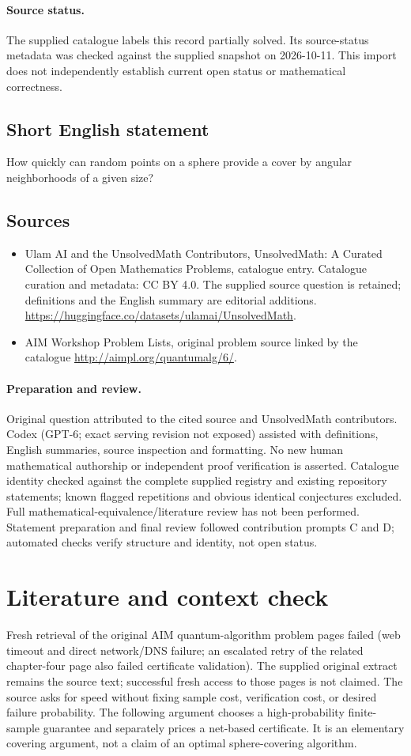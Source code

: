 \documentclass[11pt]{article}
\begin{document}
\paragraph{Source status.}
The supplied catalogue labels this record partially solved. Its source-status metadata was checked against the supplied snapshot on 2026-10-11. This import does not independently establish current open status or mathematical correctness.
\subsection{Short English statement}
How quickly can random points on a sphere provide a cover by angular neighborhoods of a given size?
\subsection{Sources}
\begin{itemize}
\item[S1] Ulam AI and the UnsolvedMath Contributors, UnsolvedMath: A Curated Collection of Open Mathematics Problems, catalogue entry. Catalogue curation and metadata: CC BY 4.0. The supplied source question is retained; definitions and the English summary are editorial additions.
\url{https://huggingface.co/datasets/ulamai/UnsolvedMath}.
\item[S2] AIM Workshop Problem Lists, original problem source linked by the catalogue
\url{http://aimpl.org/quantumalg/6/}.
\end{itemize}
\paragraph{Preparation and review.}
Original question attributed to the cited source and UnsolvedMath contributors. Codex (GPT-6; exact serving revision not exposed) assisted with definitions, English summaries, source inspection and formatting. No new human mathematical authorship or independent proof verification is asserted. Catalogue identity checked against the complete supplied registry and existing repository statements; known flagged repetitions and obvious identical conjectures excluded. Full mathematical-equivalence/literature review has not been performed. Statement preparation and final review followed contribution prompts C and D; automated checks verify structure and identity, not open status.
\label{end:statement}

\section{Literature and context check}
Fresh retrieval of the original AIM quantum-algorithm problem pages failed (web timeout and direct network/DNS failure; an escalated retry of the related chapter-four page also failed certificate validation). The supplied original extract remains the source text; successful fresh access to those pages is not claimed. The source asks for speed without fixing sample cost, verification cost, or desired failure probability. The following argument chooses a high-probability finite-sample guarantee and separately prices a net-based certificate. It is an elementary covering argument, not a claim of an optimal sphere-covering algorithm.
\end{document}
